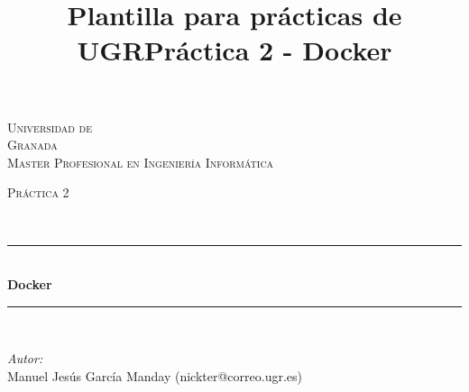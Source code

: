 \documentclass[10pt]{article}
\title{Plantilla para prácticas de UGR}
\title{Práctica 2 - Docker}
\begin{document}
\begin{center}																		%
\newcommand{\HRule}{\rule{\linewidth}{0.5mm}}									%
\begin{minipage}{0.48\textwidth} \begin{flushleft}
\end{flushleft}\end{minipage}
\begin{minipage}{0.48\textwidth} \begin{flushright}
\end{flushright}\end{minipage}

\vspace*{-1.5cm}								%
\textsc{\huge Universidad de\\ \vspace{5px} Granada}\\[1.5cm]	

\textsc{\LARGE Master Profesional en Ingenier\'ia Inform\'atica }\\[1.5cm]													%

\begin{minipage}{0.9\textwidth} 
\begin{center}																					%
\textsc{\LARGE Pr\'actica 2}
\end{center}
\end{minipage}\\[0.5cm]
 			\vspace*{1cm}																		%
\HRule \\[0.4cm]																	%
{ \huge \bfseries Docker}\\[0.4cm]	%
\HRule \\[1.5cm]																	%
\begin{minipage}{0.46\textwidth}													%
\begin{flushleft} \large															%
\emph{Autor:}\\	
Manuel Jes\'us Garc\'ia Manday (nickter@correo.ugr.es)\\
\end{flushleft}																		%
\end{minipage}		
\begin{minipage}{0.52\textwidth}		
\vspace{-0.6cm}											%
\begin{flushright} \large															%
\end{flushright}																	%
\end{minipage}	
\vspace*{1cm}
 	

\end{center}
\end{document}
